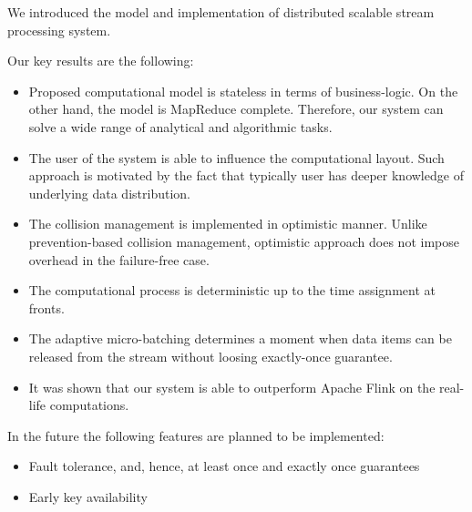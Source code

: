 
\label {fs-conclusions}

We introduced the model and implementation of distributed scalable stream processing system. 

Our key results are the following:

\begin{itemize}
    \item Proposed computational model is stateless in terms of business-logic. On the other hand, the model is MapReduce complete. Therefore, our system can solve a wide range of analytical and algorithmic tasks.
    \item The user of the system is able to influence the computational layout. Such approach is motivated by the fact that typically user has deeper knowledge of underlying data distribution.
    \item The collision management is implemented in optimistic manner. Unlike prevention-based collision management, optimistic approach does not impose overhead in the failure-free case.
    \item The computational process is deterministic up to the time assignment at fronts.
    \item The adaptive micro-batching determines a moment when data items can be released from the stream without loosing exactly-once guarantee.  
    \item It was shown that our system is able to outperform Apache Flink on the real-life computations.
\end{itemize}

In the future the following features are planned to be implemented:
\begin{itemize}
    \item Fault tolerance, and, hence, at least once and exactly once guarantees
    \item Early key availability
\end{itemize}
